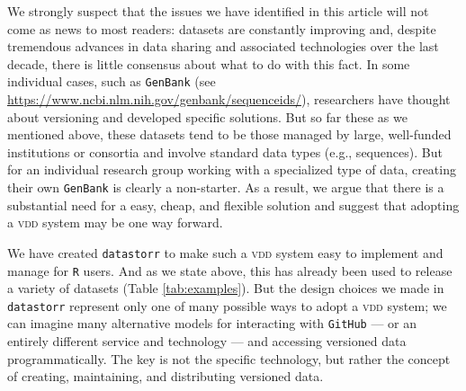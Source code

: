 \documentclass[a4paper,11pt]{article}
\newcommand{\smurl}[1]{{\footnotesize\url{#1}}}
\begin{document}
We strongly suspect that the issues we have identified in this article will not come as news to most readers: datasets are constantly improving and, despite tremendous advances in data sharing and associated technologies over the last decade, there is little consensus about what to do with this fact. In some individual cases, such as \texttt{GenBank} (see \url{https://www.ncbi.nlm.nih.gov/genbank/sequenceids/}), researchers have thought about versioning and developed specific solutions. But so far these as we mentioned above, these datasets tend to be those managed by large, well-funded institutions or consortia and involve standard data types (e.g., sequences). But for an individual research group working with a specialized type of data, creating their own \texttt{GenBank} is clearly a non-starter. As a result, we argue that there is a substantial need for a easy, cheap, and flexible solution and suggest that adopting a \textsc{vdd} system may be one way forward.

We have created \texttt{datastorr} to make such a \textsc{vdd} system easy to implement and manage for \texttt{R} users. And as we state above, this has already been used to release a variety of datasets (Table \ref{tab:examples}).
But the design choices we made in \texttt{datastorr} represent only one of many possible ways to adopt a \textsc{vdd} system; we can imagine many alternative models for interacting with \texttt{GitHub} --- or an entirely different service and technology --- and accessing versioned data programmatically.  The key is not the specific technology, but rather the concept of creating, maintaining, and distributing versioned data.

\end{document}
